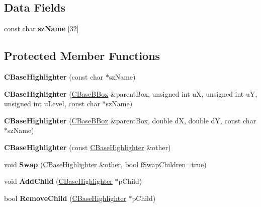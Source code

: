 \subsection*{Data Fields}
\begin{DoxyCompactItemize}
\item 
\mbox{\label{class_c_base_highlighter_a8602a164489e2650d8871ec43b155876}} 
const char {\bfseries sz\+Name} \mbox{[}32\mbox{]}
\end{DoxyCompactItemize}
\subsection*{Protected Member Functions}
\begin{DoxyCompactItemize}
\item 
\mbox{\label{class_c_base_highlighter_aca6eda19fca9586f96375cdedee59aba}} 
{\bfseries C\+Base\+Highlighter} (const char $\ast$sz\+Name)
\item 
\mbox{\label{class_c_base_highlighter_ab833e2c0d622fc91eda9e61573b426fa}} 
{\bfseries C\+Base\+Highlighter} (\hyperlink{class_c_base_b_box}{C\+Base\+B\+Box} \&parent\+Box, unsigned int uX, unsigned int uY, unsigned int u\+Level, const char $\ast$sz\+Name)
\item 
\mbox{\label{class_c_base_highlighter_a9101fe0276c64b2fc68287c36e972ddb}} 
{\bfseries C\+Base\+Highlighter} (\hyperlink{class_c_base_b_box}{C\+Base\+B\+Box} \&parent\+Box, double dX, double dY, const char $\ast$sz\+Name)
\item 
\mbox{\label{class_c_base_highlighter_a48b5457668dbf9a5a3bd706b87374bc0}} 
{\bfseries C\+Base\+Highlighter} (const \hyperlink{class_c_base_highlighter}{C\+Base\+Highlighter} \&other)
\item 
\mbox{\label{class_c_base_highlighter_a984659e2d593fbcf5517c3ef100a24c1}} 
void {\bfseries Swap} (\hyperlink{class_c_base_highlighter}{C\+Base\+Highlighter} \&other, bool f\+Swap\+Children=true)
\item 
\mbox{\label{class_c_base_highlighter_a2774da903ea3e43a6170dee3dd7527f9}} 
void {\bfseries Add\+Child} (\hyperlink{class_c_base_highlighter}{C\+Base\+Highlighter} $\ast$p\+Child)
\item 
\mbox{\label{class_c_base_highlighter_ae15824495f2c80820dcbc6d460e2a411}} 
bool {\bfseries Remove\+Child} (\hyperlink{class_c_base_highlighter}{C\+Base\+Highlighter} $\ast$p\+Child)
\end{DoxyCompactItemize}
